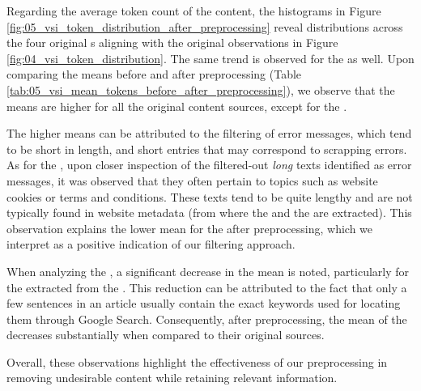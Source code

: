 


Regarding the average token count of the content, the histograms in Figure \ref{fig:05_vsi_token_distribution_after_preprocessing} reveal distributions across the four original \contentType{}s aligning with the original observations in Figure \ref{fig:04_vsi_token_distribution}. The same trend is observed for the \keyphrases{} as well. Upon comparing the means before and after preprocessing (Table \ref{tab:05_vsi_mean_tokens_before_after_preprocessing}), we observe that the means are higher for all the original content sources, except for the \trafilaturaFulltext{}.

The higher means can be attributed to the filtering of error messages, which tend to be short in length, and short entries that may correspond to scrapping errors. As for the \trafilaturaFulltext{}, upon closer inspection of the filtered-out \emph{long} texts identified as error messages, it was observed that they often pertain to topics such as website cookies or terms and conditions. These texts tend to be quite lengthy and are not typically found in website metadata (from where the \trafilaturaTitle{} and the \trafilaturaAbstract{} are extracted). This observation explains the lower mean for the \trafilaturaFulltext{} after preprocessing, which we interpret as a positive indication of our filtering approach.

When analyzing the \keyphrases{}, a significant decrease in the mean is noted, particularly for the \keyphrases{} extracted from the \trafilaturaFulltext{}. This reduction can be attributed to the fact that only a few sentences in an article usually contain the exact keywords used for locating them through Google Search. Consequently, after preprocessing, the mean of the \keyphrases{} decreases substantially when compared to their original sources.

Overall, these observations highlight the effectiveness of our preprocessing in removing undesirable content while retaining relevant information.





